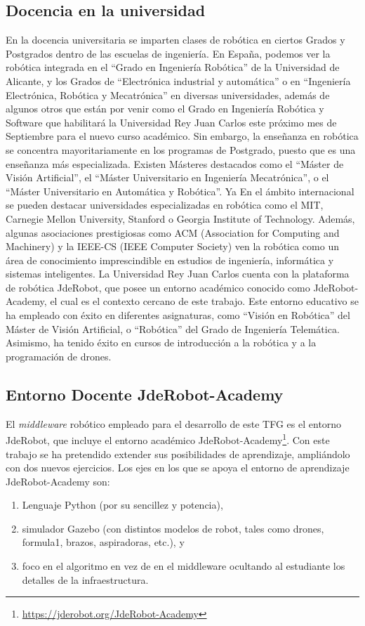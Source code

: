 \subsection{Docencia en la universidad}
En la docencia universitaria se imparten clases de robótica en ciertos Grados y Postgrados dentro de las escuelas de ingeniería. En España, podemos ver la robótica integrada en el “Grado en Ingeniería Robótica” de la Universidad de Alicante, y los Grados de “Electrónica industrial y automática” o en “Ingeniería Electrónica, Robótica y Mecatrónica” en diversas universidades, además de algunos otros que están por venir como el Grado en Ingeniería Robótica y Software que habilitará la Universidad Rey Juan Carlos este próximo mes de Septiembre para el nuevo curso académico. Sin embargo, la enseñanza en robótica se concentra mayoritariamente en los programas de Postgrado, puesto que es una enseñanza más especializada. Existen Másteres destacados como el “Máster de Visión Artificial”, el “Máster Universitario en Ingeniería Mecatrónica”, o el “Máster Universitario en Automática y Robótica”.
Ya En el ámbito internacional se pueden destacar universidades especializadas en robótica como el MIT, Carnegie Mellon University, Stanford o Georgia Institute of Technology. Además, algunas asociaciones prestigiosas como ACM (Association for Computing and Machinery) y la IEEE-CS (IEEE Computer Society) ven la robótica como un área de conocimiento imprescindible en estudios de ingeniería, informática y sistemas inteligentes.
La Universidad Rey Juan Carlos cuenta con la plataforma de robótica JdeRobot, que posee un entorno académico conocido como JdeRobot-Academy, el cual es el contexto cercano de este trabajo. Este entorno educativo se ha empleado con éxito en diferentes asignaturas, como “Visión en Robótica” del Máster de Visión Artificial, o “Robótica” del Grado de Ingeniería Telemática. Asimismo, ha tenido éxito en cursos de introducción a la robótica y a la programación de drones.


\subsection{Entorno Docente JdeRobot-Academy}
El \textit{middleware} robótico empleado para el desarrollo de este TFG es el entorno JdeRobot, que incluye el entorno académico JdeRobot-Academy\footnote{\url{https://jderobot.org/JdeRobot-Academy}}. Con este trabajo se ha pretendido extender sus posibilidades de aprendizaje, ampliándolo con dos nuevos ejercicios. 
\vspace{0.6cm}
Los ejes en los que se apoya el entorno de aprendizaje JdeRobot-Academy son:
\begin{enumerate}[label=\alph*)]
	\item Lenguaje Python (por su sencillez y potencia),
	\item simulador Gazebo (con distintos modelos de robot, tales como drones, formula1, brazos, aspiradoras, etc.), y
	\item foco en el algoritmo en vez de en el middleware ocultando al estudiante los detalles de la infraestructura.
\end{enumerate}

